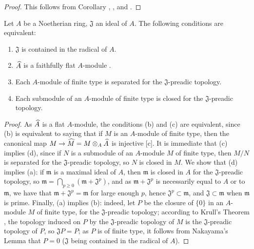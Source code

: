 \begin{proof}
\label{proof-0.7.3.4}
This follows from Corollary , ,
and .
\end{proof}

\begin{corollary}[7.3.5]
\label{0.7.3.5}
Let $A$ be a Noetherian ring, $\mathfrak{J}$ an ideal of $A$. The following conditions are
equivalent:
\begin{enumerate}[label=\emph{(\alph*)}]
  \item $\mathfrak{J}$ is contained in the radical of $A$.
  \item $\widehat{A}$ is a faithfully flat $A$-module .
  \item Each $A$-module of finite type is separated for the $\mathfrak{J}$-preadic topology.
  \item Each submodule of an $A$-module of finite type is closed for the $\mathfrak{J}$-preadic topology.
\end{enumerate}
\end{corollary}

\begin{proof}
\label{proof-0.7.3.5}
As $\widehat{A}$ is a flat $A$-module, the conditions (b) and (c) are equivalent, since
(b) is equivalent to saying that if $M$ is an $A$-module of finite type, then the canonical
map $M\to\wh{M}=M\otimes_A\wh{A}$ is injective [c].
It is immediate that (c) implies (d), since if $N$ is a submodule of an $A$-module $M$ of
finite type, then $M/N$ is separated for the $\mathfrak{J}$-preadic topology, so $N$ is
closed in $M$. We show that (d) implies (a): if $\mathfrak{m}$ is a maximal ideal of $A$,
then $\mathfrak{m}$ is closed in $A$ for the $\mathfrak{J}$-preadic topology, so
$\mathfrak{m}=\bigcap_{p\geq 0}(\mathfrak{m}+\mathfrak{J}^p)$, and as
$\mathfrak{m}+\mathfrak{J}^p$ is necessarily equal to $A$ or to $\mathfrak{m}$, we have that
$\mathfrak{m}+\mathfrak{J}^p=\mathfrak{m}$ for large enough $p$,
hence $\mathfrak{J}^p\subset\mathfrak{m}$, and $\mathfrak{J}\subset\mathfrak{m}$ when
$\mathfrak{m}$ is prime. Finally, (a) implies (b): indeed, let $P$ be the closure of $\{0\}$
in an $A$-module $M$ of finite type, for the $\mathfrak{J}$-preadic topology; according to
Krull's Theorem , the topology induced on $P$ by the
$\mathfrak{J}$-preadic topology of $M$ is the $\mathfrak{J}$-preadic topology of $P$,
so $\mathfrak{J}P=P$; as $P$ is of finite type, it follows from Nakayama's Lemma that
$P=0$ ($\mathfrak{J}$ being contained in the radical of $A$).
\end{proof}

